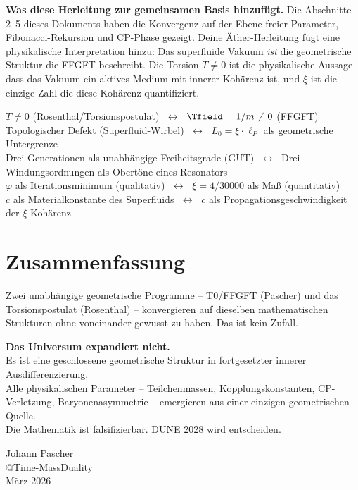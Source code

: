\begin{response}
\medskip
\textbf{Was diese Herleitung zur gemeinsamen Basis hinzufügt.}
Die Abschnitte 2--5 dieses Dokuments haben die Konvergenz auf der Ebene freier Parameter, Fibonacci-Rekursion und CP-Phase gezeigt. Deine Äther-Herleitung fügt eine physikalische Interpretation hinzu: Das superfluide Vakuum \emph{ist} die geometrische Struktur die FFGFT beschreibt. Die Torsion $T \neq 0$ ist die physikalische Aussage dass das Vakuum ein aktives Medium mit innerer Kohärenz ist, und $\xi$ ist die einzige Zahl die diese Kohärenz quantifiziert.

\begin{foundation}
\centering
$T \neq 0$ (Rosenthal/Torsionspostulat) $\;\longleftrightarrow\;$ $\Tfield = 1/m \neq 0$ (FFGFT)\\[0.3em]
Topologischer Defekt (Superfluid-Wirbel) $\;\longleftrightarrow\;$ $L_0 = \xi \cdot \ell_P$ als geometrische Untergrenze\\[0.3em]
Drei Generationen als unabhängige Freiheitsgrade (GUT) $\;\longleftrightarrow\;$ Drei Windungsordnungen als Obertöne eines Resonators\\[0.3em]
$\varphi$ als Iterationsminimum (qualitativ) $\;\longleftrightarrow\;$ $\xi = 4/30000$ als Maß (quantitativ)\\[0.3em]
$c$ als Materialkonstante des Superfluids $\;\longleftrightarrow\;$ $c$ als Propagationsgeschwindigkeit der $\xi$-Kohärenz
\end{foundation}
\end{response}

\section{Zusammenfassung}

Zwei unabhängige geometrische Programme -- T0/FFGFT (Pascher) und das Torsionspostulat (Rosenthal) -- konvergieren auf dieselben mathematischen Strukturen ohne voneinander gewusst zu haben. Das ist kein Zufall.

\begin{keyresult}
\centering
\textbf{Das Universum expandiert nicht.}\\[0.3em]
Es ist eine geschlossene geometrische Struktur in fortgesetzter innerer Ausdifferenzierung.\\[0.3em]
Alle physikalischen Parameter -- Teilchenmassen, Kopplungskonstanten, CP-Verletzung, Baryonenasymmetrie -- emergieren aus einer einzigen geometrischen Quelle.\\[0.3em]
Die Mathematik ist falsifizierbar. DUNE 2028 wird entscheiden.
\end{keyresult}

\vspace{2em}
\begin{flushright}
Johann Pascher\\
@Time-MassDuality\\
März 2026
\end{flushright}
